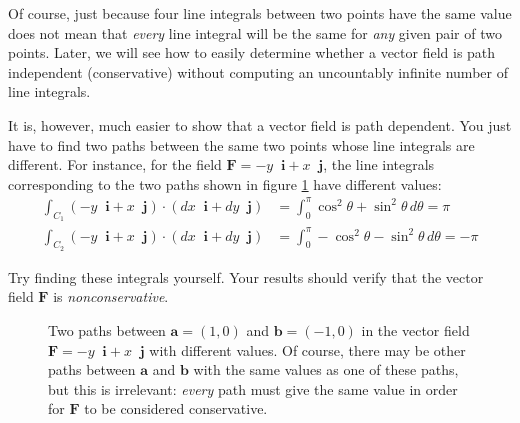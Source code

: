 \documentclass{myarticle}
\renewcommand{\vec}[1]{\mathbf{#1}}
\newcommand{\unitvector}[1]{
  \mathop{}\!\vec{#1}
}
\newcommand{\ih}{\unitvector{i}}
\newcommand{\jh}{\unitvector{j}}
\theoremstyle{nospace}
\newtheorem{old series theorem}{Theorem}
\newenvironment{series theorem}{\begin{mdframed}\begin{old series theorem}}{\end{old series theorem}\end{mdframed}}
\begin{document}
Of course, just because four line integrals between two points have the same value does not mean that \textit{every} line integral will be the same for \textit{any} given pair of two points. Later, we will see how to easily determine whether a vector field is path independent (conservative) without computing an uncountably infinite number of line integrals.

It is, however, much easier to show that a vector field is path dependent. You just have to find two paths between the same two points whose line integrals are different. For instance, for the field $\vec{F} = -y \ih + x \jh$, the line integrals corresponding to the two paths shown in figure \ref{fig:path dependence} have different values:
\begin{align*}
\int_{C_1} \left(-y \ih + x \jh\right) \cdot \left(dx \ih + dy \jh\right) &= \int_0^\pi \cos^2 \theta + \sin^2 \theta \,d\theta = \pi \\
\int_{C_2} \left(-y \ih + x \jh\right) \cdot \left(dx \ih + dy \jh\right) &= \int_0^\pi -\cos^2 \theta - \sin^2 \theta \,d\theta = -\pi
\end{align*}

Try finding these integrals yourself. Your results should verify that the vector field $\vec{F}$ is \textit{nonconservative}.

\begin{figure}[htb!] \centering
{}
\caption{Two paths between $\vec{a} = (1, 0)$ and $\vec{b} = (-1, 0)$ in the vector field $\vec{F} = -y \ih + x \jh$ with different values. Of course, there may be other paths between $\vec{a}$ and $\vec{b}$ with the same values as one of these paths, but this is irrelevant: \textit{every} path must give the same value in order for $\vec{F}$ to be considered conservative.}
\label{fig:path dependence}
\end{figure}
\end{document}
